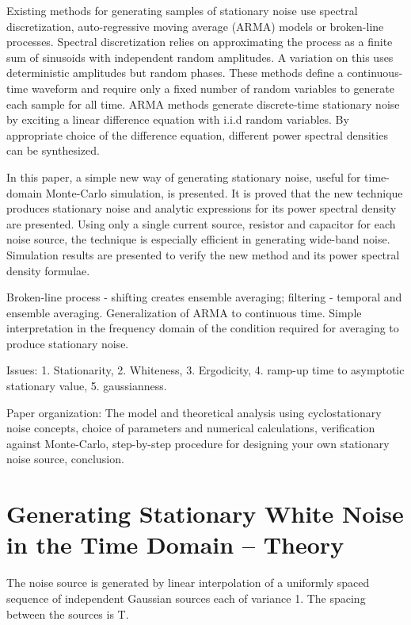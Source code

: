\documentclass[9pt,times]{article}
\begin{document}
{Existing methods for generating samples of stationary noise use spectral
discretization, auto-regressive moving average (ARMA) models or broken-line
processes. Spectral discretization relies on approximating the process as a
finite sum of sinusoids with independent random amplitudes\cite{reference}.
A variation on this uses deterministic amplitudes but random
phases\cite{reference}. These methods define a continuous-time waveform and
require only a fixed number of random variables to generate each sample for
all time. ARMA methods generate discrete-time stationary noise by exciting a
linear difference equation with i.i.d random variables\cite{reference}. By
appropriate choice of the difference equation, different power spectral
densities can be synthesized.

In this paper, a simple new way of generating stationary noise, useful for
time-domain Monte-Carlo simulation, is presented. It is proved that the new
technique produces stationary noise and analytic expressions for its power
spectral density are presented. Using only a single current source, resistor
and capacitor for each noise source, the technique is especially efficient
in generating wide-band noise. Simulation results are presented to verify
the new method and its power spectral density formulae.

Broken-line process - shifting creates ensemble averaging; filtering -
temporal and ensemble averaging. Generalization of ARMA to continuous time.
Simple interpretation in the frequency domain of the condition required for
averaging to produce stationary noise.

Issues: 1. Stationarity, 2. Whiteness, 3. Ergodicity, 4. ramp-up time
	to asymptotic stationary value, 5. gaussianness.

Paper organization: The model and theoretical analysis using cyclostationary
noise concepts, choice of parameters and numerical calculations,
verification against Monte-Carlo, step-by-step procedure for
designing your own stationary noise source, conclusion.
}

\section{Generating Stationary White Noise in the Time Domain -- Theory}
\label{sec:theory}
The noise source is generated by linear interpolation of a uniformly spaced
sequence of independent Gaussian sources each of variance 1. The spacing
between the sources is T.
\end{document}
